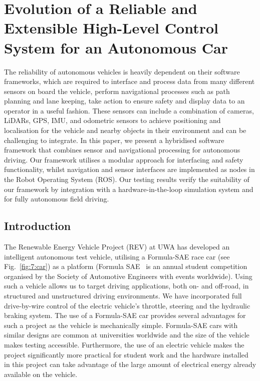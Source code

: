 
\chapter[Evolution of a Reliable and Extensible High-Level Control System]{Evolution of a Reliable and Extensible High-Level Control System for an Autonomous Car}
\label{ch:evo}

\ifpdf
	\graphicspath{{Chapter7/Figs/Raster/}{Chapter7/Figs/PDF/}{Chapter7/Figs/}}
\else
	\graphicspath{{Chapter7/Figs/Vector/}{Chapter7/Figs/}}
\fi

The reliability of autonomous vehicles is heavily dependent on their software frameworks, which are required to interface and process data from many different sensors on board the vehicle, perform navigational processes such as path planning and lane keeping, take action to ensure safety and display data to an operator in a useful fashion. These sensors can include a combination of cameras, LiDARs, GPS, IMU, and odometric sensors to achieve positioning and localisation for the vehicle and nearby objects in their environment and can be challenging to integrate. In this paper, we present a hybridised software framework that combines sensor and navigational processing for autonomous driving. Our framework utilises a modular approach for interfacing and safety functionality, whilst navigation and sensor interfaces are implemented as nodes in the Robot Operating System (ROS). Our testing results verify the suitability of our framework by integration with a hardware-in-the-loop simulation system and for fully autonomous field driving.

\section{Introduction}
The Renewable Energy Vehicle Project (REV) at UWA has developed an intelligent autonomous test vehicle, utilising a Formula-SAE race car (see Fig.~\ref{fig:7:car}) as a platform (Formula SAE~\cite{sae_international_student_nodate} is an annual student competition organised by the Society of Automotive Engineers with events worldwide). Using such a vehicle allows us to target driving applications, both on- and off-road, in structured and unstructured driving environments. We have incorporated full drive-by-wire control of the electric vehicle's throttle, steering and the hydraulic braking system. The use of a Formula-SAE car provides several advantages for such a project as the vehicle is mechanically simple. Formula-SAE cars with similar designs are common at universities worldwide and the size of the vehicle makes testing accessible. Furthermore, the use of an electric vehicle makes the project significantly more practical for student work and the hardware installed in this project can take advantage of the large amount of electrical energy already available on the vehicle.

